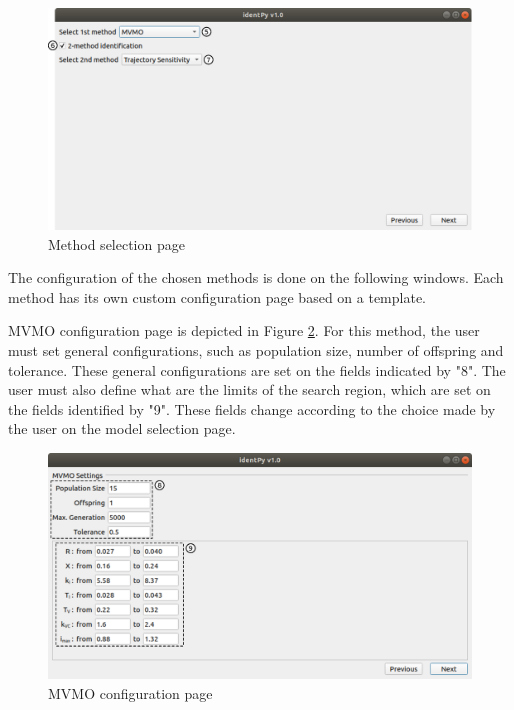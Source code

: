 \begin{figure}[!h]
	\caption{Method selection page}
	\begin{center}
		\includegraphics[scale=.5]{Images/Software_method_page.eps}
	\end{center}
	\label{fig: method_selection}
\end{figure}

The configuration of the chosen methods is done on the following windows. Each method has its own custom configuration page based on a template.

MVMO configuration page is depicted in Figure \ref{fig: MVMO_page}. For this method, the user must set general configurations, such as population size, number of offspring and tolerance. These general configurations are set on the fields indicated by "8". The user must also define what are the limits of the search region, which are set on the fields identified by "9". These fields change according to the choice made by the user on the model selection page.

\begin{figure}[!h]
	\caption{MVMO configuration page}
	\begin{center}
		\includegraphics[scale=.5]{Images/Software_MVMO_page.eps}
	\end{center}
	\label{fig: MVMO_page}
\end{figure}

